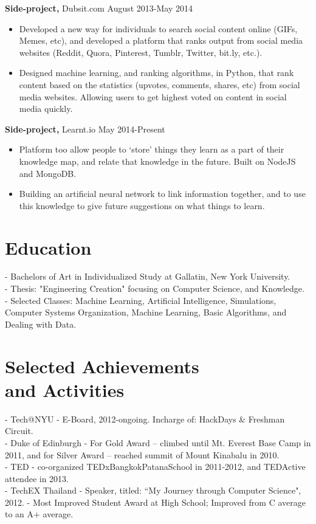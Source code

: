 \documentclass[margin]{res}
\begin{document}
\begin{resume}
 {\bf Side-project,} Dubsit.com \hfill August 2013-May 2014
 \begin{itemize} \itemsep -2pt 
 \item Developed a new way for individuals to search social content online (GIFs, Memes, etc), and developed a platform that ranks output from social media websites (Reddit, Quora, Pinterest, Tumblr, Twitter, bit.ly, etc.).
 \item Designed machine learning, and ranking algorithms, in Python, that rank content based on the statistics (upvotes, comments, shares, etc) from social media websites. Allowing users to get highest voted on content in social media quickly.
 \end{itemize}
 
{\bf Side-project,} Learnt.io \hfill May 2014-Present
\begin{itemize} \itemsep -2pt 
\item Platform too allow people to `store' things they learn as a part of their knowledge map, and relate that knowledge in the future. Built on NodeJS and MongoDB.
\item Building an artificial neural network to link information together, and to use this knowledge to give future suggestions on what things to learn.
\end{itemize}

\section{Education} 
- Bachelors of Art in Individualized Study at Gallatin, New York University. \\
- Thesis: "Engineering Creation" focusing on Computer Science, and Knowledge. \\
- Selected Classes: Machine Learning, Artificial Intelligence, Simulations, Computer Systems Organization, Machine Learning, Basic Algorithms, and Dealing with Data.

\section{Selected Achievements \\ and Activities} 
- Tech@NYU - E-Board, 2012-ongoing. Incharge of: HackDays \& Freshman Circuit. \\
- Duke of Edinburgh - For Gold Award -- climbed until Mt. Everest Base Camp in 2011, and for Silver Award -- reached summit of Mount Kinabalu in 2010. \\
- TED - co-organized TEDxBangkokPatanaSchool in 2011-2012, and TEDActive attendee in 2013. \\
- TechEX Thailand - Speaker, titled: ``My Journey through Computer Science", 2012.
- Most Improved Student Award at High School; Improved from C average to an A+ average.


\end{resume}
\end{document}
